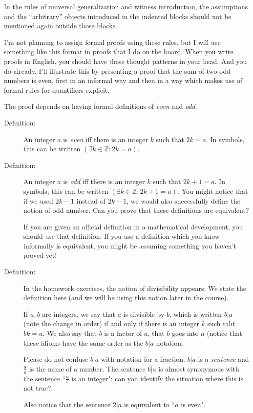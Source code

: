 \documentclass[12pt]{article}
\begin{document}
In the rules of universal generalization and witness introduction, the assumptions and the ``arbitrary'' objects introduced in the indented blocks should not be mentioned again outside those blocks.

I'm not planning to assign formal proofs using these rules, but I will use something like this format in proofs that I do on the board.  When you write proofs in English, you should have these thought patterns in your head.  And you do already.  I'll illustrate this by presenting a  proof that the sum of two odd numbers is even, first in an informal way and then in a way which makes use of formal rules for quantifiers explicit.

The proof depends on having formal definitions of {\em even\/} and {\em odd\/}.

\begin{description}

\item[Definition:]  An integer $a$ is {\em even\/} iff there is an integer $k$ such that $2k=a$.  In symbols, this can be written $(\exists k \in \mathbb Z:2k=a)$.

\item[Definition:]  An integer $a$ is {\em odd\/} iff there is an integer $k$ such that $2k+1=a$.  In symbols, this can be written $(\exists k \in \mathbb Z:2k+1=a)$.  You might notice
that if we used $2k-1$ instead of $2k+1$, we would also successfully define the notion of odd number.  Can you prove that these definitions are equivalent?

If you are given an official definition in a mathematical development, you should use that definition.  If you use a definition which you know informally is equivalent, you might be assuming something you haven't proved yet!

\item[Definition:]  In the homework exercises, the notion of divisibility appears.  We state the definition here (and we will be using this notion later in the course).

If $a,b$ are integers, we say that $a$ is divisible by $b$, which is written $b|a$ (note the change in order) if and only if there is an integer $k$ such taht $bk=a$.
We also say that $b$ is a factor of $a$, that $b$ goes into $a$ (notice that these idioms have the same order as the $b|a$ notation.

Please do not confuse $b|a$ with notation for a fraction.  $b|a$ is a {\em sentence\/} and $\frac ab$ is the name of a number.  The sentence $b|a$ is almost synonymous
with the sentence ``$\frac ab$ is an integer":  can you identify the situation where this is not true?

Also notice that the sentence $2|a$ is equivalent to ``$a$ is even".

\end{description}
\end{document}
